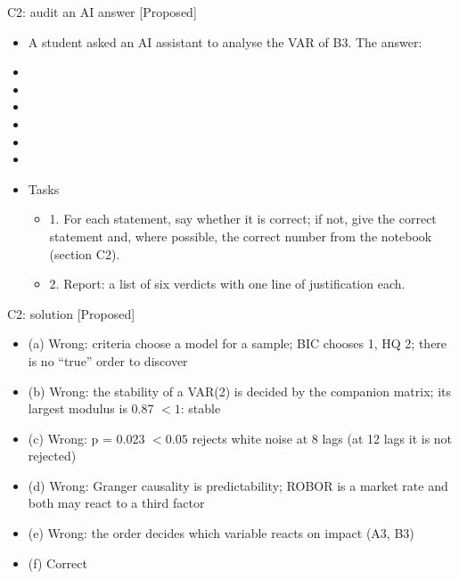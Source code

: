 \begin{frame}{C2: audit an AI answer [Proposed]}
\itemsize{\scriptsize}
\begin{itemize}
    \item A student asked an AI assistant to analyse the VAR of B3. The answer:
    \item {}
    \item {}
    \item {}
    \item {}
    \item {}
    \item {}
    \item Tasks
    \begin{itemize}
        \item 1. For each statement, say whether it is correct; if not, give the correct statement and, where possible, the correct number from the notebook (section C2).
        \item 2. Report: a list of six verdicts with one line of justification each.
    \end{itemize}
\end{itemize}
\end{frame}

\ifsolutions
\begin{frame}{C2: solution [Proposed]}
\itemsize{\scriptsize}
\begin{itemize}
    \item (a) Wrong: criteria choose a model for a sample; BIC chooses 1, HQ 2; there is no ``true'' order to discover
    \item (b) Wrong: the stability of a VAR(2) is decided by the companion matrix; its largest modulus is 0.87 $< 1$: stable
    \item (c) Wrong: p = 0.023 $< 0.05$ rejects white noise at 8 lags (at 12 lags it is not rejected)
    \item (d) Wrong: Granger causality is predictability; ROBOR is a market rate and both may react to a third factor
    \item (e) Wrong: the order decides which variable reacts on impact (A3, B3)
    \item (f) Correct
\end{itemize}
\end{frame}
\fi


